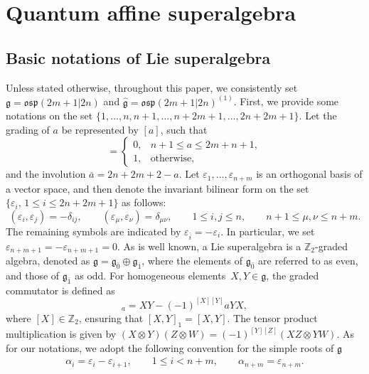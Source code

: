 \documentclass[10pt,a4paper]{amsart}
\numberwithin{equation}{section}
\begin{document}
\section{Quantum affine superalgebra}\label{sec2}

\subsection{Basic notations of Lie superalgebra}
 Unless stated otherwise, throughout this paper, we consistently set $\mathfrak{g}=\mathfrak{osp}(2m+1|2n)$ and $\mathfrak{\hat{g}}=\mathfrak{osp}(2m+1|2n)^{(1)}$. First, we provide some notations on the set $\{1,\dots,n,n+1,\dots,n+2m+1,\dots,2n+2m+1\}$. Let the grading of $a$ be represented by $[a]$, such that
\begin{equation*}
 [a]=
 \begin{cases}
 0,&n+1\leq a\leq2m+n+1,\\
 1,& \text{otherwise},
 \end{cases}
\end{equation*}and the involution $\overline{a}=2n+2m+2-a$. Let $\varepsilon_1,\dots,\varepsilon_{n+m}$ is an orthogonal basis of a vector space,
 and then denote the invariant bilinear form on the set $\{\varepsilon_i,\, 1\leq i\leq2n+2m+1\}$ as follows:
\begin{equation*}
 (\varepsilon_i,\varepsilon_j)=-\delta_{ij},\qquad (\varepsilon_\mu,\varepsilon_\nu)=\delta_{\mu\nu}, \qquad 1\leq i,j\leq n,\qquad n+1\leq \mu,\nu\leq n+m.
\end{equation*}
The remaining symbols are indicated by $\varepsilon_{\overline{i}} =-\varepsilon_i$. In particular, we set
${\varepsilon_{n+m+1}=-\varepsilon_{n+m+1}=0}$.
As is well known, a Lie superalgebra is a $\mathbb{Z}_2$-graded algebra, denoted as $\mathfrak{g}=\mathfrak{g}_{\bar{0}}\oplus\mathfrak{g}_{\bar{1}}$, where the elements of $\mathfrak{g}_{\bar{0}}$ are referred to as even, and those of $\mathfrak{g}_{\bar{1}}$ as odd. For homogeneous elements~${X,Y\in \mathfrak{g}}$, the graded commutator is defined as
\begin{equation*}
[X, Y]_{a}=XY-(-1)^{[X][Y]}aYX,
\end{equation*}where $[X]\in \mathbb{Z}_2$,
 ensuring that $[X, Y]_{1}=[X, Y]$.
The tensor product multiplication is given by
$(X\otimes Y)(Z\otimes W)=(-1)^{[Y][Z]}(XZ\otimes YW)$.
 As for our notations, we adopt the following convention for the simple roots of $\mathfrak{g}$
 \begin{align*}
 \alpha_{i}=\varepsilon_i-\varepsilon_{i+1}, \qquad 1\leq i<n+m, \qquad \alpha_{n+m}=\varepsilon_{n+m}.
\end{align*}
\end{document}

